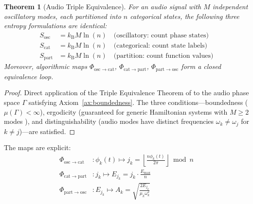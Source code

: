 \documentclass[twocolumn,10pt]{article}
\newtheorem{theorem}{Theorem}[section]
\theoremstyle{remark}
\newcommand{\kB}{k_{\mathrm{B}}}
\begin{document}
\begin{theorem}[Audio Triple Equivalence]
\label{thm:audio_triple}
For an audio signal with $M$ independent oscillatory modes, each partitioned into $n$ categorical states, the following three entropy formulations are identical:
\begin{align}
    S_{\mathrm{osc}} &= \kB M \ln(n) \quad \text{(oscillatory: count phase states)} \\
    S_{\mathrm{cat}} &= \kB M \ln(n) \quad \text{(categorical: count state labels)} \\
    S_{\mathrm{part}} &= \kB M \ln(n) \quad \text{(partition: count function values)}
\end{align}
Moreover, algorithmic maps $\Phi_{\mathrm{osc} \to \mathrm{cat}}$, $\Phi_{\mathrm{cat} \to \mathrm{part}}$, $\Phi_{\mathrm{part} \to \mathrm{osc}}$ form a closed equivalence loop.
\end{theorem}

\begin{proof}
Direct application of the Triple Equivalence Theorem of \cite{sachikonye2026counting} to the audio phase space $\Gamma$ satisfying Axiom~\ref{ax:boundedness}. The three conditions---boundedness ($\mu(\Gamma) < \infty$), ergodicity (guaranteed for generic Hamiltonian systems with $M \geq 2$ modes \cite{tabor1989}), and distinguishability (audio modes have distinct frequencies $\omega_k \neq \omega_j$ for $k \neq j$)---are satisfied.
\end{proof}

The maps are explicit:
\begin{align}
    \Phi_{\mathrm{osc} \to \mathrm{cat}}&: \phi_k(t) \mapsto j_k = \left\lfloor \frac{n \phi_k(t)}{2\pi} \right\rfloor \bmod n \label{eq:map_osc_cat} \\
    \Phi_{\mathrm{cat} \to \mathrm{part}}&: j_k \mapsto E_{j_k} = j_k \cdot \frac{E_{\max}}{n} \label{eq:map_cat_part} \\
    \Phi_{\mathrm{part} \to \mathrm{osc}}&: E_{j_k} \mapsto A_k = \sqrt{\frac{2E_{j_k}}{\mu_k \omega_k^2}} \label{eq:map_part_osc}
\end{align}
\end{document}
